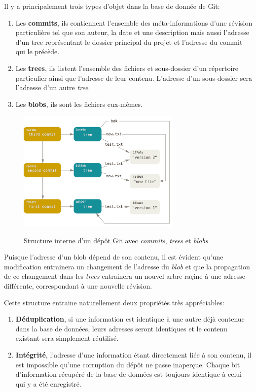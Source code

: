 \documentclass[11pt,a4paper]{article}
\begin{document}
Il y a principalement trois types d'objet dans la base de donnée de Git:

\begin{enumerate}
	\item Les {\bf commits},
	ils contiennent l'ensemble des méta-informations d'une révision particulière tel que son auteur, la date et une description mais aussi l'adresse d'un tree représentant le dossier principal du projet et l'adresse du commit qui le précède.
	
	\item Les {\bf trees},
	ils listent l'ensemble des fichiers et sous-dossier d'un répertoire particulier ainsi que l'adresse de leur contenu.
	L'adresse d'un sous-dossier sera l'adresse d'un autre \textit{tree}.
	
	\item Les {\bf blobs},
	ils sont les fichiers eux-mêmes.
\end{enumerate}

\begin{figure}[H]
\begin{center}
\includegraphics[width=8cm]{img_structure} \cite{progit}
\caption{Structure interne d'un dépôt Git avec \textit{commits}, \textit{trees} et \textit{blobs}}
\end{center}
\end{figure}

Puisque l'adresse d'un blob dépend de son contenu, il est évident qu'une modification entrainera un changement de l'adresse du \textit{blob} et que la propagation de ce changement dans les \textit{trees} entrainera un nouvel arbre raçine à une adresse différente, correspondant à une nouvelle révision.

Cette structure entraine naturellement deux propriétés très appréciables:

\begin{enumerate}
	\item \textbf{Déduplication}, 
	si une information est identique à une autre déjà contenue dans la base de données, leurs adresses seront identiques et le contenu existant sera simplement réutilisé.
	
	\item \textbf{Intégrité},
	l'adresse d'une information étant directement liée à son contenu, il est impossible qu'une corruption du dépôt ne passe inaperçue.
	Chaque bit d'information récupéré de la base de données est toujours identique à celui qui y a été enregistré.
\end{enumerate}
\end{document}
